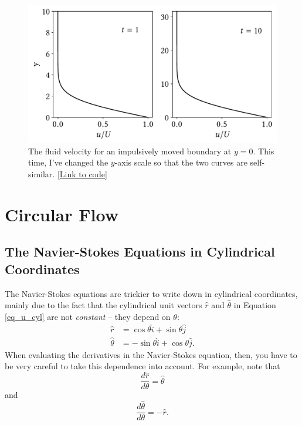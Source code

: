 \begin{figure}
\centering
\includegraphics[width=0.8\linewidth]{Figures/Chapter2/fig_ss_vel2}
\caption{The fluid velocity for an impulsively moved boundary at $y=0$.  This time, I've changed the $y$-axis scale so that the two curves are self-similar. \href{https://nbviewer.jupyter.org/github/josephmacmillan/IntroFluidDynamics/blob/master/Jupyter/2-ViscousFluids.ipynb\#Figure-2.7:-Self-similar-flow}{[Link to code]}}
\label{fig_ss_vel2}
\end{figure}


%
% 

\section{Circular Flow}



\subsection{The Navier-Stokes Equations in Cylindrical Coordinates}
\label{sec_ns_cyl}

The Navier-Stokes equations are trickier to write down in cylindrical coordinates, mainly due to the fact that the cylindrical unit vectors $\hat{r}$ and $\hat{\theta}$ in Equation \ref{eq_u_cyl} are not \emph{constant} -- they depend on $\theta$:
\begin{align*}
\hat{r} & = \cos \theta \hat{i} + \sin \theta \hat{j} \\
\hat{\theta} & = - \sin \theta \hat{i} + \cos \theta \hat{j}.
\end{align*}
When evaluating the derivatives in the Navier-Stokes equation, then, you have to be very careful to take this dependence into account.  For example, note that
\[
\frac{d\hat{r}}{d\theta} = \hat{\theta}
\]
and
\[
\frac{d\hat{\theta}}{d\theta} = - \hat{r}.
\]

